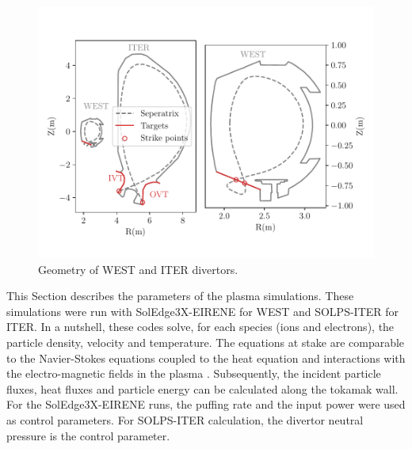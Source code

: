 \begin{figure}[h!]
    \centering
    \includegraphics[width=0.95\linewidth]{Figures/Chapter4/coordinates.pdf}
    \caption{Geometry of WEST and ITER divertors.}
\end{figure}
This Section describes the parameters of the plasma simulations.
These simulations were run with SolEdge3X-EIRENE for WEST and SOLPS-ITER for ITER.
In a nutshell, these codes solve, for each species (ions and electrons), the particle density, velocity and temperature.
The equations at stake are comparable to the Navier-Stokes equations coupled to the heat equation and interactions with the electro-magnetic fields in the plasma .
Subsequently, the incident particle fluxes, heat fluxes and particle energy can be calculated along the tokamak wall.
For the SolEdge3X-EIRENE runs, the puffing rate and the input power were used as control parameters.
For SOLPS-ITER calculation, the divertor neutral pressure is the control parameter.

